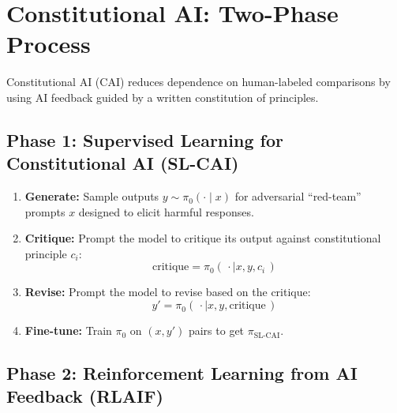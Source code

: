 \section{Constitutional AI: Two-Phase Process}
\label{sec:app10-cai}

Constitutional AI (CAI) \autocite{bai2022constitutional} reduces dependence on human-labeled comparisons by using AI feedback guided by a written constitution of principles.

\subsection{Phase 1: Supervised Learning for Constitutional AI (SL-CAI)}

\begin{enumerate}
    \item \textbf{Generate:} Sample outputs $y \sim \pi_0(\cdot \mid x)$ for adversarial ``red-team'' prompts $x$ designed to elicit harmful responses.
    \item \textbf{Critique:} Prompt the model to critique its output against constitutional principle $c_i$:
    \begin{equation}
    \text{critique} = \pi_0(\,\cdot \mid x, y, c_i\,)
    \label{eq:cai-critique}
    \end{equation}
    \item \textbf{Revise:} Prompt the model to revise based on the critique:
    \begin{equation}
    y' = \pi_0(\,\cdot \mid x, y, \text{critique}\,)
    \label{eq:cai-revise}
    \end{equation}
    \item \textbf{Fine-tune:} Train $\pi_0$ on $(x, y')$ pairs to get $\pi_{\text{SL-CAI}}$.
\end{enumerate}

\subsection{Phase 2: Reinforcement Learning from AI Feedback (RLAIF)}

